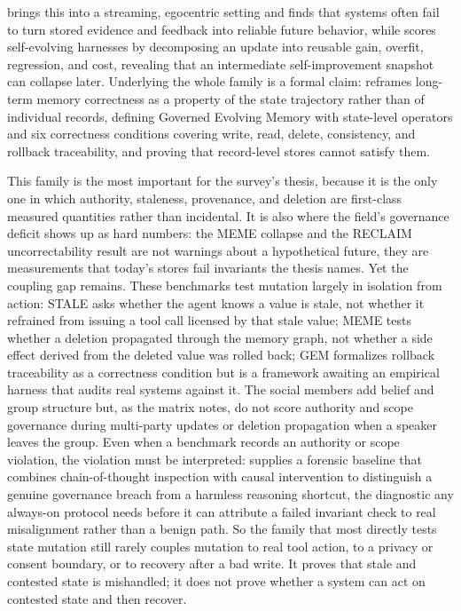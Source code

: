 \citet{liu2026streammembench} brings this into a streaming, egocentric setting and finds that systems often fail to turn stored evidence and feedback into reliable future behavior, while \citet{zheng2026seagym} scores self-evolving harnesses by decomposing an update into reusable gain, overfit, regression, and cost, revealing that an intermediate self-improvement snapshot can collapse later. Underlying the whole family is a formal claim: \citet{orogat2026gem} reframes long-term memory correctness as a property of the state trajectory rather than of individual records, defining Governed Evolving Memory with state-level operators and six correctness conditions covering write, read, delete, consistency, and rollback traceability, and proving that record-level stores cannot satisfy them.

This family is the most important for the survey's thesis, because it is the only one in which authority, staleness, provenance, and deletion are first-class measured quantities rather than incidental. It is also where the field's governance deficit shows up as hard numbers: the MEME collapse and the RECLAIM uncorrectability result are not warnings about a hypothetical future, they are measurements that today's stores fail invariants the thesis names. Yet the coupling gap remains. These benchmarks test mutation largely in isolation from action: STALE asks whether the agent knows a value is stale, not whether it refrained from issuing a tool call licensed by that stale value; MEME tests whether a deletion propagated through the memory graph, not whether a side effect derived from the deleted value was rolled back; GEM formalizes rollback traceability as a correctness condition but is a framework awaiting an empirical harness that audits real systems against it. The social members add belief and group structure but, as the matrix notes, do not score authority and scope governance during multi-party updates or deletion propagation when a speaker leaves the group. Even when a benchmark records an authority or scope violation, the violation must be interpreted: \citet{singh2026modelforensics} supplies a forensic baseline that combines chain-of-thought inspection with causal intervention to distinguish a genuine governance breach from a harmless reasoning shortcut, the diagnostic any always-on protocol needs before it can attribute a failed invariant check to real misalignment rather than a benign path. So the family that most directly tests state mutation still rarely couples mutation to real tool action, to a privacy or consent boundary, or to recovery after a bad write. It proves that stale and contested state is mishandled; it does not prove whether a system can act on contested state and then recover.

